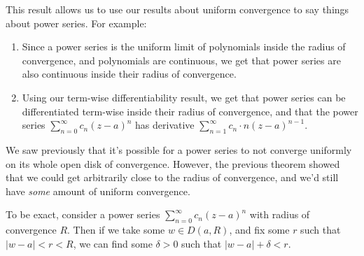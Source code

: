 This result allows us to use our results about uniform convergence to say things about power series. For example:

\begin{enumerate}
    \item Since a power series is the uniform limit of polynomials inside the radius of convergence, and polynomials are continuous, we get that power series are also continuous inside their radius of convergence.
    \item Using our term-wise differentiability result, we get that power series can be differentiated term-wise inside their radius of convergence, and that the power series $\sum_{n = 0}^{\infty} c_n(z - a)^n$ has derivative $\sum_{n = 1}^{\infty} c_n \cdot n (z - a)^{n - 1}$. 
\end{enumerate} 

We saw previously that it's possible for a power series to not converge uniformly on its whole open disk of convergence. However, the previous theorem showed that we could get arbitrarily close to the radius of convergence, and we'd still have \emph{some} amount of uniform convergence.

To be exact, consider a power series $\sum_{n = 0}^{\infty} c_n(z - a)^n$ with radius of convergence $R$. Then if we take some $w \in D(a, R)$, and fix some $r$ such that $|w - a| < r < R$, we can find some $\delta > 0$ such that $|w - a| + \delta < r$.

